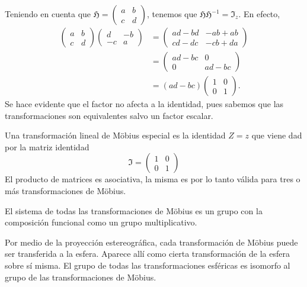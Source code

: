 \documentclass{matematicasud}
\begin{document}
Teniendo en cuenta que $\mathfrak{H}=\begin{pmatrix}
    a & b\\
    c & d
\end{pmatrix}$, tenemos que $\mathfrak{H}\mathfrak{H}^{-1}=\mathfrak{I}_z$. En efecto,
\begin{align*}
    \begin{pmatrix}
        a & b\\
        c & d
    \end{pmatrix}
    \begin{pmatrix}
        d & -b\\
        -c & a
    \end{pmatrix} 
    &=
    \begin{pmatrix}
        ad-bd & -ab+ab \\
        cd-dc & -cb+da
    \end{pmatrix}\\
    &=
    \begin{pmatrix}
        ad-bc & 0 \\
        0 & ad-bc
    \end{pmatrix}\\
    &=(ad-bc)
    \begin{pmatrix}
        1 & 0 \\
        0 & 1
    \end{pmatrix}.
\end{align*}
Se hace evidente que el factor no afecta a la identidad, pues sabemos que las transformaciones son equivalentes salvo un factor escalar.

Una transformación lineal de Möbius especial es la identidad $Z=z$ que viene dad por la matriz identidad
\begin{equation*}
    \mathfrak{I}=
    \begin{pmatrix}
        1 & 0 \\
        0 & 1
    \end{pmatrix}
\end{equation*}
El producto de matrices es asociativa, la misma es por lo tanto válida para tres o más transformaciones de Möbius.
\begin{teorema}
    El sistema de todas las transformaciones de Möbius es un grupo con la composición funcional como un grupo multiplicativo.
\end{teorema}
Por medio de la proyección estereográfica, cada transformación de Möbius puede ser transferida a la esfera. Aparece allí como cierta transformación de la esfera sobre sí misma. El grupo de todas las transformaciones esféricas es isomorfo al grupo de las transformaciones de Möbius.
\end{document}
